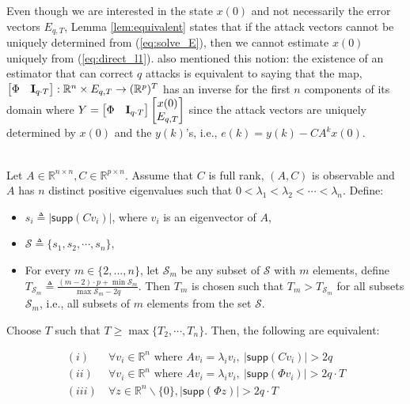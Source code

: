 \documentclass[../../thesis.tex]{subfiles}
\begin{document}
Even though we are interested in the state $x(0)$ and not necessarily the error vectors $E_{q,T}$, Lemma \ref{lem:equivalent} states that if the attack vectors cannot be uniquely determined from (\ref{eq:solve_E}), then we cannot estimate $x(0)$ uniquely from (\ref{eq:direct_l1}). \cite{Fawzi:2014} also mentioned this notion: the existence of an estimator that can correct $q$ attacks is equivalent to saying that the map, $\begin{bmatrix} \Phi & {\bf I}_{q\cdot T} \end{bmatrix}: \mathbb{R}^n \times E_{q,T} \rightarrow (\mathbb{R}^p)^T$ has an inverse for the first $n$ components of its domain where $Y = \begin{bmatrix} \Phi & {\bf I}_{q\cdot T} \end{bmatrix} \begin{bmatrix} x(0) \\ E_{q,T} \end{bmatrix} $ since the attack vectors are uniquely determined by $x(0)$ and the $y(k)$'s, i.e., $e(k) = y(k) - CA ^k x(0)$. 
\\
\\
\begin{theorem} Let $A \in \mathbb{R}^{n\times n}, C \in \mathbb{R}^{p\times n}$. Assume that $C$ is full rank, $(A,C)$ is observable and $A$ has $n$ distinct positive eigenvalues such that $0 < \lambda_1 < \lambda_2 < \cdots < \lambda_n$. 
Define:
\begin{itemize}
\item
$s_i \triangleq \lvert \textsf{supp} (Cv_i) \vert$, where $v_i$ is an eigenvector of $A$, 
\item
$\mathcal{S} \triangleq \{ s_1, s_2, \cdots, s_n \}$,
\item
For every $m \in \{2, \ldots, n\}$, let $\mathcal{S}_m$ be any subset of $\mathcal{S}$ with $m$ elements, define $T_{\mathcal{S}_m} \triangleq \frac {  (m-2) \cdot p + \min \mathcal{S}_m } {\max \mathcal{S}_m - 2q }$.
Then $T_m$ is chosen such that $T_m > T_{\mathcal{S}_m}$ for all subsets $\mathcal{S}_m$, i.e., all subsets of $m$ elements from the set $\mathcal{S}$.
\end{itemize}

Choose $T$ such that  $T \ge \max \{ T_2, \cdots, T_n \}$.
Then, the following are equivalent:

\begin{equation}
\begin{aligned} 
 (i)  &~\forall v_i \in \mathbb{R}^n \text{ where } Av_i =\lambda_i v_i, ~ \lvert \textsf{supp}(Cv_i) \rvert > 2q  \\
  (ii)  &~\forall v_i \in \mathbb{R}^n \text{ where } Av_i =\lambda_i v_i,  ~\lvert \textsf{supp} (\Phi v_i) \rvert > 2q \cdot T  \\
  (iii) &~  \forall z \in \mathbb{R}^n\backslash \{0 \}, \lvert \textsf{supp} (\Phi z) \rvert > 2 q \cdot T  \nonumber %
\label{eq:new_condition}
\end{aligned}
\end{equation}
\end{theorem}
\end{document}
